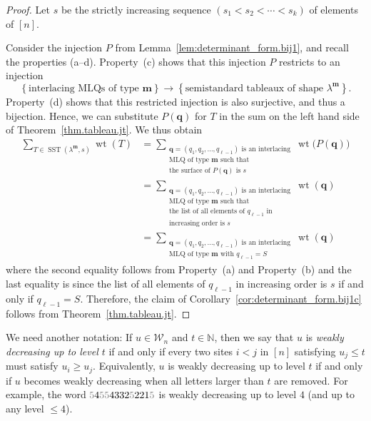 \documentclass[reqno]{amsart}
\newcommand{\0}{\phantom{c}}
\DeclareMathOperator{\wt}{wt} %
\DeclareMathOperator{\SST}{SST} %
\newcommand{\mm}{\mathbf{m}}
\newcommand{\qq}{\mathbf{q}}
\newcommand{\mcW}{\mathcal{W}}
\newcommand{\NN}{\mathbb{N}}
\let\sumnonlimits\sum
\renewcommand{\sum}{\sumnonlimits\limits}
\newcommand{\set}[1]{\left\{ #1 \right\}}
\newcommand{\tup}[1]{\left( #1 \right)}
\newcommand{\ive}[1]{\left[ #1 \right]}
\newcommand{\defn}[1]{{\color{darkred}\emph{#1}}} %
\theoremstyle{plain}
\theoremstyle{definition}
\numberwithin{equation}{section}
\begin{document}
\begin{proof}
Let $s$ be the strictly increasing sequence $\tup{s_1 < s_2 < \cdots < s_k}$ of elements of $\ive{n}$.

Consider the injection $P$ from Lemma~\ref{lem:determinant_form.bij1}, and recall the properties (a--d).
Property~(c) shows that this injection $P$ restricts to an injection
\[
\set{\text{interlacing MLQs of type } \mm}  \to \set{  \text{semistandard tableaux of shape } \lambda^{\mm}}.
\]
Property~(d) shows that this restricted injection is also surjective, and thus a bijection.
Hence, we can substitute $P(\qq)$ for $T$ in the sum on the left hand side of Theorem~\ref{thm.tableau.jt}.
We thus obtain
\begin{align*}
\sum_{T \in \SST(\lambda^{\mm}, s)} \wt(T)
  & = \sum_{\substack{\qq=\tup{q_1, q_2, \dotsc, q_{\ell-1}} \text{ is an interlacing}\\\text{MLQ of type } \mm \text{ such that} \\\text{the surface of }P(\qq) \text{ is } s}} \wt\bigl(  P(\qq) \bigr) \\
&  = \sum_{\substack{\qq= \tup{q_1, q_2, \dotsc,q_{\ell-1}} \text{ is an interlacing}\\\text{MLQ of type } \mm \text{ such that}\\\text{the list of all elements of } q_{\ell-1} \text{ in} \\\text{increasing order is } s}} \wt(\qq) \\
&  = \sum_{\substack{\qq = \tup{q_1,q_2,\dotsc,q_{\ell-1}} \text{ is an interlacing}\\\text{MLQ of type } \mm \text{ with } q_{\ell-1} = S}} \wt(\qq)
\end{align*}
where the second equality follows from Property~(a) and Property~(b) and the last equality is since the list of all elements of $q_{\ell-1}$ in increasing order is $s$ if and only if $q_{\ell-1}=S$.
Therefore, the claim of Corollary~\ref{cor:determinant_form.bij1c} follows from Theorem~\ref{thm.tableau.jt}.
\end{proof}

We need another notation:
If $u \in \mcW_n$ and $t \in \NN$, then we say that $u$ is \defn{weakly decreasing up to level $t$} if and only if every two sites $i < j$ in $\ive{n}$ satisfying $u_j \leq t$ must satisfy $u_i \geq u_j$.
Equivalently, $u$ is weakly decreasing up to level $t$ if and only if $u$ becomes weakly decreasing when all letters larger than $t$ are removed.
For example, the word ${\color{gray}5}4{\color{gray}55}4332{\color{gray}5}221{\color{gray}5}$ is weakly decreasing up to level $4$ (and up to any level $\leq4$).
\end{document}
